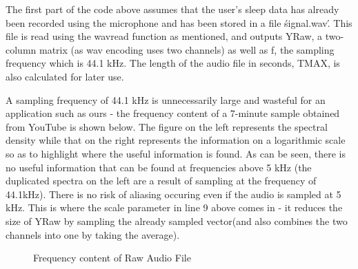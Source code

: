 The first part of the code above assumes that the user's sleep data has already been recorded using the microphone and has been stored in a file \'signal.wav\'. This file is read using the wavread function as mentioned, and outputs YRaw, a two-column matrix (as wav encoding uses two channels) as well as f, the sampling frequency which is 44.1 kHz. The length of the audio file in seconds, TMAX, is also calculated for later use.

A sampling frequency of 44.1 kHz is unnecessarily large and wasteful for an application such as ours - the frequency content of a 7-minute sample obtained from YouTube \cite{simplevideo} is shown below. The figure on the left represents the spectral density while that on the right represents the information on a logarithmic scale so as to highlight where the useful information is found. As can be seen, there is no useful information that can be found at frequencies above 5 kHz (the duplicated spectra on the left are a result of sampling at the frequency of 44.1kHz). There is no risk of aliasing occuring even if the audio is sampled at 5 kHz. This is where the scale parameter in line 9 above comes in - it reduces the size of YRaw by sampling the already sampled vector(and also combines the two channels into one by taking the average). 

\begin{figure}[htb]
	\centering
	\caption{Frequency content of Raw Audio File}
	\label{fig:simpleRawFreqContent}
\end{figure}


